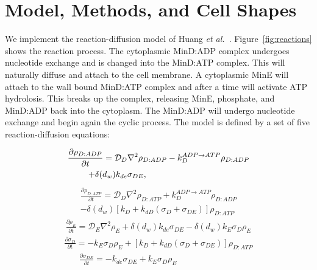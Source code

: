 \documentclass[letterpaper,twocolumn,amsmath,amssymb,pre]{revtex4-1}
\begin{document}
\section{Model, Methods, and Cell Shapes}
We implement the reaction-diffusion model of Huang \emph{et
  al.}~\cite{huang2003dynamic}.  Figure~\ref{fig:reactions} shows the
reaction process.  The cytoplasmic MinD:ADP complex undergoes
nucleotide exchange and is changed into the MinD:ATP complex.  This
will naturally diffuse and attach to the cell membrane.  A cytoplasmic
MinE will attach to the wall bound MinD:ATP complex and after a time
will activate ATP hydrolosis.  This breaks up the complex, releasing
MinE, phosphate, and MinD:ADP back into the cytoplasm.  The MinD:ADP
will undergo nucleotide exchange and begin again the cyclic process.
The model is defined by a set of five reaction-diffusion equations:

\begin{multline}
  \frac{\partial \rho_{D:ADP}}{\partial t} = \mathcal{D}_D\nabla^2\rho_{D:ADP}-k_D^{ADP\rightarrow ATP}\rho_{D:ADP}\\
  +\delta(d_w)k_{de}\sigma_{DE},\hspace{3.4cm}
\end{multline}
\begin{multline}
  \frac{\partial \rho_{D:ATP}}{\partial t} = \mathcal{D}_D\nabla^2\rho_{D:ATP}+k_D^{ADP\rightarrow ATP}\rho_{D:ADP}\\
  -\delta(d_w)[k_D+k_{dD}(\sigma_D+\sigma_{DE})]\rho_{D:ATP}
\end{multline}
\begin{multline}
  \frac{\partial \rho_E}{\partial t} = \mathcal{D}_E\nabla^2\rho_E+\delta(d_w)k_{de}\sigma_{DE}
  -\delta(d_w)k_E \sigma_D \rho_E
\end{multline}
\begin{multline}
  \frac{\partial \sigma_D}{\partial t} = -k_E\sigma_D\rho_E
  +[k_D+k_{dD}(\sigma_D+\sigma_{DE})]\rho_{D:ATP}
  \label{eq:d-on-wall}
\end{multline}
\begin{multline}
  \frac{\partial \sigma_{DE}}{\partial t} = -k_{de}\sigma_{DE}+k_E\sigma_D\rho_E\hspace{3cm}
  \label{eq:FifthPDE}
\end{multline}
\end{document}
